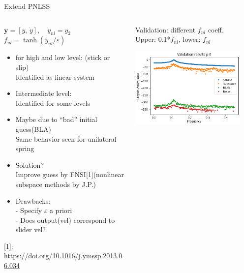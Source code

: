 \documentclass[9pt]{beamer}
\newcommand{\vect}[1]{\mathbf{#1}}
\begin{document}
\begin{frame}{Extend PNLSS}
\begin{columns}
\begin{column}{0.5\textwidth}
      \vspace{5mm}
      \centering $\vect y = [y,\, \dot y], \quad \dot y_{nl} = y_2$\\
      \centering $f_{nl} = \tanh(\dot y_{nl} / \varepsilon)$
      \begin{itemize}
      \item for high and low level: (stick or slip)\\
        Identified as linear system
      \item Intermediate level:\\
        Identified for some levels
      \item Maybe due to ``bad'' initial guess(BLA)\\
        Same behavior seen for unilateral spring
      \item Solution?\\
        Improve guess by FNSI[1](nonlinear subspace methods by J.P.)
      \item Drawbacks:\\
        - Specify $\varepsilon$ a priori\\
        - Does output(vel) correspond to slider vel?
      \end{itemize}
      \vspace{+1cm}
      \footnotesize{[1]: \url{https://doi.org/10.1016/j.ymssp.2013.06.034}}
    \end{column}
    \begin{column}{0.5\textwidth}  %
      Validation: different $f_{nl}$ coeff.\\ Upper: 0.1*$f_{nl}$, lower: $f_{nl}$
      \begin{center}
        \includegraphics[width=0.9\textwidth]{fig/nlss_tahn_E1}

\end{center}
\end{column}
\end{columns}
\end{frame}
\end{document}
